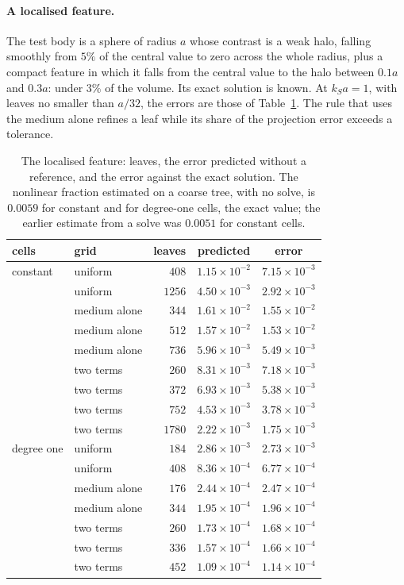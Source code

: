 \documentclass[11pt,a4paper]{article}
\begin{document}
\paragraph{A localised feature.} The test body is a sphere of radius $a$ whose contrast is a weak
halo, falling smoothly from $5\%$ of the central value to zero across the whole radius, plus a
compact feature in which it falls from the central value to the halo between $0.1a$ and $0.3a$: under
$3\%$ of the volume. Its exact solution is known. At $k_Sa=1$, with leaves no smaller than $a/32$, the
errors are those of Table~\ref{tab:refine}. The rule that uses the medium alone refines a leaf while
its share of the projection error exceeds a tolerance.
\begin{table}[htbp]
\centering
\caption{The localised feature: leaves, the error predicted without a reference, and the error against
the exact solution. The nonlinear fraction estimated on a coarse tree, with no solve, is
$0.0059$ for constant and for degree-one cells, the exact value; the earlier estimate from a solve was
$0.0051$ for constant cells.}\label{tab:refine}
\small
\begin{tabular}{@{}llrcc@{}}
\toprule
cells & grid & leaves & predicted & error \\
\midrule
constant & uniform & $408$ & $1.15\times10^{-2}$ & $7.15\times10^{-3}$ \\
 & uniform & $1256$ & $4.50\times10^{-3}$ & $2.92\times10^{-3}$ \\
 & medium alone & $344$ & $1.61\times10^{-2}$ & $1.55\times10^{-2}$ \\
 & medium alone & $512$ & $1.57\times10^{-2}$ & $1.53\times10^{-2}$ \\
 & medium alone & $736$ & $5.96\times10^{-3}$ & $5.49\times10^{-3}$ \\
 & two terms & $260$ & $8.31\times10^{-3}$ & $7.18\times10^{-3}$ \\
 & two terms & $372$ & $6.93\times10^{-3}$ & $5.38\times10^{-3}$ \\
 & two terms & $752$ & $4.53\times10^{-3}$ & $3.78\times10^{-3}$ \\
 & two terms & $1780$ & $2.22\times10^{-3}$ & $1.75\times10^{-3}$ \\
\midrule
degree one & uniform & $184$ & $2.86\times10^{-3}$ & $2.73\times10^{-3}$ \\
 & uniform & $408$ & $8.36\times10^{-4}$ & $6.77\times10^{-4}$ \\
 & medium alone & $176$ & $2.44\times10^{-4}$ & $2.47\times10^{-4}$ \\
 & medium alone & $344$ & $1.95\times10^{-4}$ & $1.96\times10^{-4}$ \\
 & two terms & $260$ & $1.73\times10^{-4}$ & $1.68\times10^{-4}$ \\
 & two terms & $336$ & $1.57\times10^{-4}$ & $1.66\times10^{-4}$ \\
 & two terms & $452$ & $1.09\times10^{-4}$ & $1.14\times10^{-4}$ \\
\bottomrule
\end{tabular}
\end{table}
\end{document}
